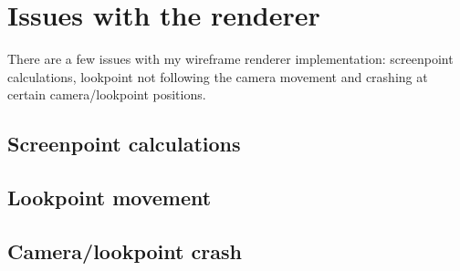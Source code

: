 \section{Issues with the renderer}
There are a few issues with my wireframe renderer implementation: screenpoint calculations, lookpoint not following the camera movement and crashing at certain camera/lookpoint positions.
\subsection{Screenpoint calculations}
\subsection{Lookpoint movement}
\subsection{Camera/lookpoint crash}